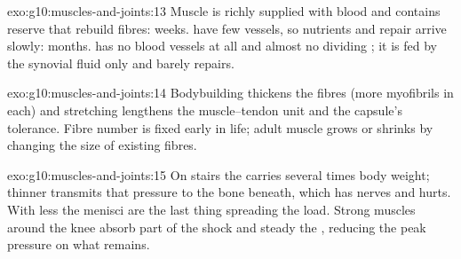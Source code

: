\begin{solution}{exo:g10:muscles-and-joints:13}
Muscle is richly supplied with blood and contains reserve  that
rebuild fibres: weeks.  have few vessels, so nutrients and
repair  arrive slowly: months.  has no blood vessels at
all and almost no dividing ; it is fed by the synovial fluid only
and barely repairs.
\end{solution}

\begin{solution}{exo:g10:muscles-and-joints:14}
Bodybuilding thickens the fibres (more myofibrils in each) and
stretching lengthens the muscle--tendon unit and the capsule's
tolerance. Fibre number is fixed early in life; adult muscle grows or
shrinks by changing the size of existing fibres.
\end{solution}

\begin{solution}{exo:g10:muscles-and-joints:15}
On stairs the  carries several times body weight; thinner
 transmits that pressure to the bone beneath, which has
nerves and hurts. With less  the menisci are the last thing
spreading the load. Strong muscles around the knee absorb part of the
shock and steady the , reducing the peak pressure on what
 remains.
\end{solution}

